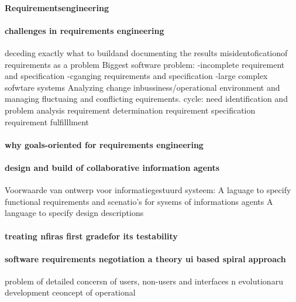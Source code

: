 \paragraph{Requirementsengineering}

 \cite{jonkerTreurKlush200informativeAgents}
\cite{boehmBoseLeeRequirementsNegotiations}
\cite{muHungJinLiu2013inconsistencyReqs}
\cite{hunterNuseibeh1996manageSpecs}
\cite{myloloupos1992representingReqs}
\cite{zavePamela4darkCorners}
\cite{zavePAmela1997regEngineering}

\paragraph{challenges in requirements engineering}
deceding exactly what to buildand documenting the results
misidentoficationof requirements as a problem
Biggest software problem:
-incomplete requirement and specification
-cganging requirements and specification
-large complex sofwtare systems
Analyzing change inbussiness/operational environment and managing fluctuaing and conflicting equirements.
cycle:
need identification and problem analysis
requirement determination
requirement specification
requirement fulfilllment

\paragraph{why goals-oriented for requirements engineering}

\paragraph{design and build of collaborative information agents}
Voorwaarde van ontwerp voor informatiegestuurd systeem:
A laguage to specify functional requirements and scenatio's for sysems of informations agents
A language to specify design descriptions
\paragraph{treating nfiras first gradefor its testability}

\paragraph{software requirements negotiation a theory ui based spiral approach}
problem of detailed concersn of users, non-users and interfaces n evolutionaru development
ceoncept of operational

